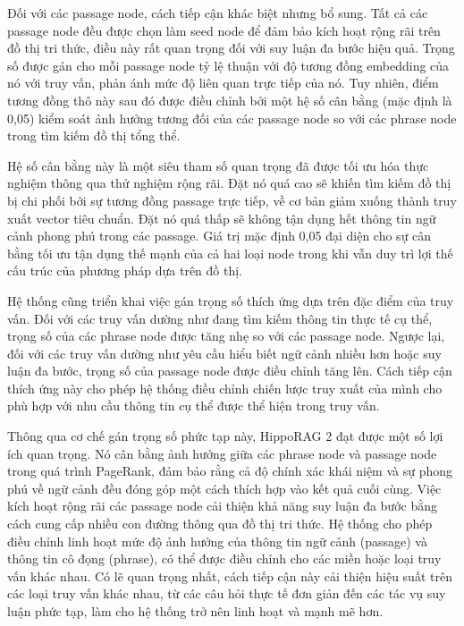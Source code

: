 \documentclass[../main.tex]{subfiles}
\begin{document}
Đối với các passage node, cách tiếp cận khác biệt nhưng bổ sung. Tất cả các passage node đều được chọn làm seed node để đảm bảo kích hoạt rộng rãi trên đồ thị tri thức, điều này rất quan trọng đối với suy luận đa bước hiệu quả. Trọng số được gán cho mỗi passage node tỷ lệ thuận với độ tương đồng embedding của nó với truy vấn, phản ánh mức độ liên quan trực tiếp của nó. Tuy nhiên, điểm tương đồng thô này sau đó được điều chỉnh bởi một hệ số cân bằng (mặc định là 0,05) kiểm soát ảnh hưởng tương đối của các passage node so với các phrase node trong tìm kiếm đồ thị tổng thể.

Hệ số cân bằng này là một siêu tham số quan trọng đã được tối ưu hóa thực nghiệm thông qua thử nghiệm rộng rãi. Đặt nó quá cao sẽ khiến tìm kiếm đồ thị bị chi phối bởi sự tương đồng passage trực tiếp, về cơ bản giảm xuống thành truy xuất vector tiêu chuẩn. Đặt nó quá thấp sẽ không tận dụng hết thông tin ngữ cảnh phong phú trong các passage. Giá trị mặc định 0,05 đại diện cho sự cân bằng tối ưu tận dụng thế mạnh của cả hai loại node trong khi vẫn duy trì lợi thế cấu trúc của phương pháp dựa trên đồ thị.

Hệ thống cũng triển khai việc gán trọng số thích ứng dựa trên đặc điểm của truy vấn. Đối với các truy vấn dường như đang tìm kiếm thông tin thực tế cụ thể, trọng số của các phrase node được tăng nhẹ so với các passage node. Ngược lại, đối với các truy vấn dường như yêu cầu hiểu biết ngữ cảnh nhiều hơn hoặc suy luận đa bước, trọng số của passage node được điều chỉnh tăng lên. Cách tiếp cận thích ứng này cho phép hệ thống điều chỉnh chiến lược truy xuất của mình cho phù hợp với nhu cầu thông tin cụ thể được thể hiện trong truy vấn.

Thông qua cơ chế gán trọng số phức tạp này, HippoRAG 2 đạt được một số lợi ích quan trọng. Nó cân bằng ảnh hưởng giữa các phrase node và passage node trong quá trình PageRank, đảm bảo rằng cả độ chính xác khái niệm và sự phong phú về ngữ cảnh đều đóng góp một cách thích hợp vào kết quả cuối cùng. Việc kích hoạt rộng rãi các passage node cải thiện khả năng suy luận đa bước bằng cách cung cấp nhiều con đường thông qua đồ thị tri thức. Hệ thống cho phép điều chỉnh linh hoạt mức độ ảnh hưởng của thông tin ngữ cảnh (passage) và thông tin cô đọng (phrase), có thể được điều chỉnh cho các miền hoặc loại truy vấn khác nhau. Có lẽ quan trọng nhất, cách tiếp cận này cải thiện hiệu suất trên các loại truy vấn khác nhau, từ các câu hỏi thực tế đơn giản đến các tác vụ suy luận phức tạp, làm cho hệ thống trở nên linh hoạt và mạnh mẽ hơn.
\end{document}

